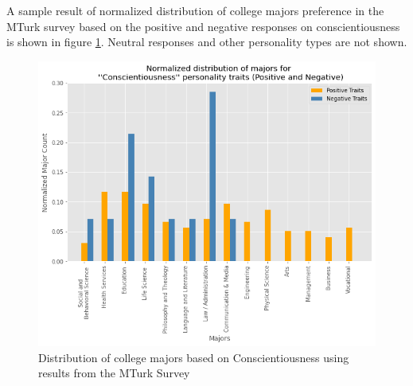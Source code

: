 \documentclass[conference]{IEEEtran}
\begin{document}
A sample result of normalized distribution of college majors preference in the MTurk survey based on
the positive and negative responses on conscientiousness is shown in figure \ref{fig:c}. Neutral responses and other personality types are not shown.




\begin{figure}[h]
\includegraphics[scale=0.4]{figs/c.png}
\caption{Distribution of college majors based on Conscientiousness  using results from the MTurk Survey}
\label{fig:c}
\centering
\end{figure}


\end{document}
